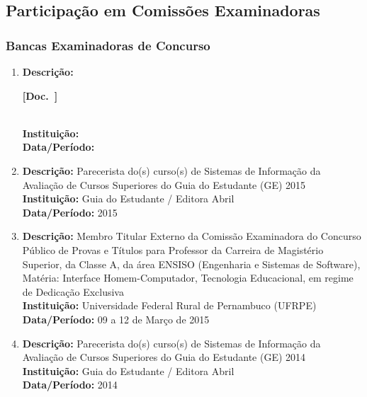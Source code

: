 \documentclass[a4paper,oneside,10pt]{article}
\newcounter{document}%
\newcommand\Doc{{\addtocounter{document}{1}\mbox{\sffamily\bfseries [Doc. \arabic{document}]}}}
\begin{document}
\subsection{Participa\c{c}\~{a}o em Comiss\~{o}es Examinadoras}
\vspace{0.3cm}

\subsubsection{Bancas Examinadoras de Concurso}
\vspace{0.3cm}

\begin{enumerate}
\renewcommand{\labelenumi}{{\large\bfseries\arabic{enumi}.}}
\vspace{0.3cm}

\item       \textbf{Descrição:} \Doc \\
            \textbf{Instituição:} \\
            \textbf{Data/Período:} 

\item       \textbf{Descrição:} Parecerista do(s) curso(s) de Sistemas de Informação da Avaliação de Cursos Superiores do Guia do Estudante (GE) 2015 \mbox{}\\
            \textbf{Instituição:} Guia do Estudante / Editora Abril \\
            \textbf{Data/Período:} 2015 %

\item       \textbf{Descrição:} Membro Titular Externo da Comissão Examinadora do Concurso Público de Provas e Títulos para Professor da Carreira de Magistério Superior, da Classe A, da área ENSISO (Engenharia e Sistemas de Software), Matéria: Interface Homem-Computador, Tecnologia Educacional, em regime de Dedicação Exclusiva \mbox{} \\
            \textbf{Instituição:} Universidade Federal Rural de Pernambuco (UFRPE)\\
            \textbf{Data/Período:} 09 a 12 de Março de 2015

\item       \textbf{Descrição:} Parecerista do(s) curso(s) de Sistemas de Informação da Avaliação de Cursos Superiores do Guia do Estudante (GE) 2014 \mbox{}\\
            \textbf{Instituição:} Guia do Estudante / Editora Abril \\
            \textbf{Data/Período:} 2014 %
\end{enumerate}
\end{document}
